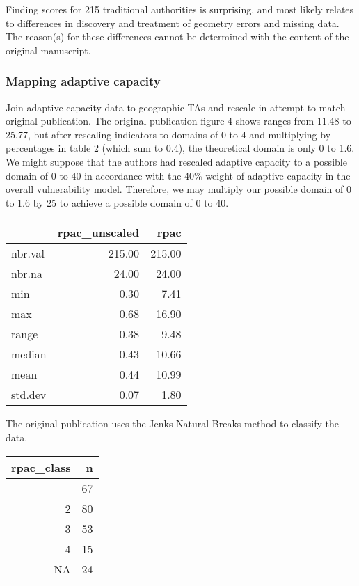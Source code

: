 \documentclass[
]{article}
\begin{document}
Finding scores for 215 traditional authorities is surprising, and most
likely relates to differences in discovery and treatment of geometry
errors and missing data. The reason(s) for these differences cannot be
determined with the content of the original manuscript.

\hypertarget{mapping-adaptive-capacity}{%
\subsubsection{Mapping adaptive
capacity}\label{mapping-adaptive-capacity}}

Join adaptive capacity data to geographic TAs and rescale in attempt to
match original publication. The original publication figure 4 shows
ranges from 11.48 to 25.77, but after rescaling indicators to domains of
0 to 4 and multiplying by percentages in table 2 (which sum to 0.4), the
theoretical domain is only 0 to 1.6. We might suppose that the authors
had rescaled adaptive capacity to a possible domain of 0 to 40 in
accordance with the 40\% weight of adaptive capacity in the overall
vulnerability model. Therefore, we may multiply our possible domain of 0
to 1.6 by 25 to achieve a possible domain of 0 to 40.

\begin{longtable}[]{@{}lrr@{}}
\toprule\noalign{}
& rpac\_unscaled & rpac \\
\midrule\noalign{}
\endhead
\bottomrule\noalign{}
\endlastfoot
nbr.val & 215.00 & 215.00 \\
nbr.na & 24.00 & 24.00 \\
min & 0.30 & 7.41 \\
max & 0.68 & 16.90 \\
range & 0.38 & 9.48 \\
median & 0.43 & 10.66 \\
mean & 0.44 & 10.99 \\
std.dev & 0.07 & 1.80 \\
\end{longtable}

The original publication uses the Jenks Natural Breaks method to
classify the data.

\begin{longtable}[]{@{}rr@{}}
\toprule\noalign{}
rpac\_class & n \\
\midrule\noalign{}
\endhead
\bottomrule\noalign{}
\endlastfoot
1 & 67 \\
2 & 80 \\
3 & 53 \\
4 & 15 \\
NA & 24 \\
\end{longtable}
\end{document}
